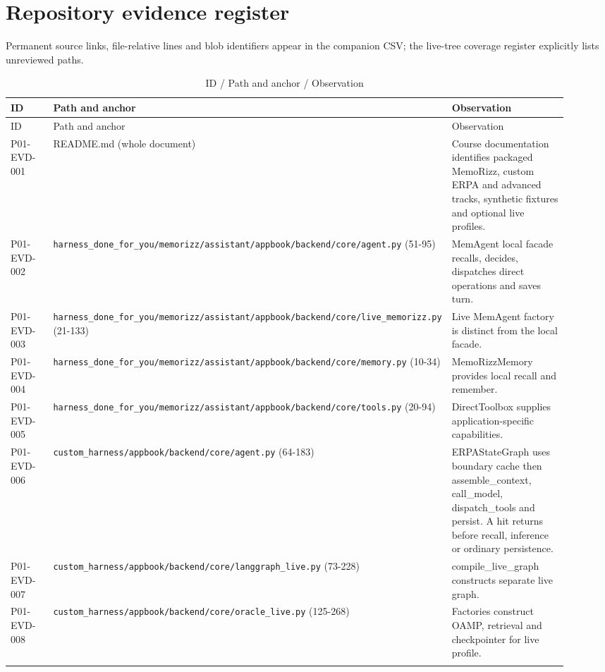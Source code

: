\documentclass[10pt,letterpaper]{article}
\begin{document}
\appendix
\section{Repository evidence register}
Permanent source links, file-relative lines and blob identifiers appear in the companion CSV; the live-tree coverage register explicitly lists unreviewed paths.
\begin{longtable}{@{}>{\raggedright\arraybackslash}p{0.16\linewidth}>{\raggedright\arraybackslash}p{0.34\linewidth}>{\raggedright\arraybackslash}p{0.42\linewidth}@{}}
\caption{ID / Path and anchor / Observation}\\
\toprule ID & Path and anchor & Observation\\\midrule\endfirsthead
\toprule ID & Path and anchor & Observation\\\midrule\endhead
P01-EVD-001 & README.md (whole document) & Course documentation identifies packaged MemoRizz, custom ERPA and advanced tracks, synthetic fixtures and optional live profiles.\\\addlinespace
P01-EVD-002 & \nolinkurl{harness_done_for_you/memorizz/assistant/appbook/backend/core/agent.py} (51-95) & MemAgent local facade recalls, decides, dispatches direct operations and saves turn.\\\addlinespace
P01-EVD-003 & \nolinkurl{harness_done_for_you/memorizz/assistant/appbook/backend/core/live_memorizz.py} (21-133) & Live MemAgent factory is distinct from the local facade.\\\addlinespace
P01-EVD-004 & \nolinkurl{harness_done_for_you/memorizz/assistant/appbook/backend/core/memory.py} (10-34) & MemoRizzMemory provides local recall and remember.\\\addlinespace
P01-EVD-005 & \nolinkurl{harness_done_for_you/memorizz/assistant/appbook/backend/core/tools.py} (20-94) & DirectToolbox supplies application-specific capabilities.\\\addlinespace
P01-EVD-006 & \nolinkurl{custom_harness/appbook/backend/core/agent.py} (64-183) & ERPAStateGraph uses boundary cache then assemble\_context, call\_model, dispatch\_tools and persist. A hit returns before recall, inference or ordinary persistence.\\\addlinespace
P01-EVD-007 & \nolinkurl{custom_harness/appbook/backend/core/langgraph_live.py} (73-228) & compile\_live\_graph constructs separate live graph.\\\addlinespace
P01-EVD-008 & \nolinkurl{custom_harness/appbook/backend/core/oracle_live.py} (125-268) & Factories construct OAMP, retrieval and checkpointer for live profile.\\\addlinespace

\end{longtable}
\end{document}
